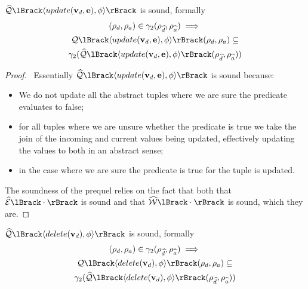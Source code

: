 \begin{conjecture}
    \label{thm:sound-update}
    $\abssqlsem{\langle update(\absattrs, \absexps), \abspred \rangle}$ is sound, formally
    \begin{multline*}
    (\rho_d, \rho_a)
        \in \concrete_2(\rho_{\ab{d}}, \rho_{\ab{a}}) \implies \\
        \sqlsem{\langle update(\absattrs, \absexps), \abspred \rangle}(\rho_d, \rho_a) \subseteq \\
        \concrete_2(\abssqlsem{\langle update(\absattrs, \absexps), \abspred \rangle}(\rho_{\ab{d}}, \rho_{\ab{a}}))
    \end{multline*}
\end{conjecture}


\begin{proof}
    \pfsketch\
    Essentially $\abssqlsem{\langle update(\absattrs, \absexps), \abspred \rangle}$ is sound because:
    \begin{itemize}
        \item We do not update all the abstract tuples where we are sure the predicate evaluates to false;
        \item for all tuples where we are unsure whether the predicate is true we take the join of the incoming and current values being updated, effectively updating the values to both in an abstract sense;
        \item in the case where we are sure the predicate is true for the tuple is updated.
    \end{itemize}
    The soundness of the prequel relies on the fact that both that $\absexpsem{\cdot}$ is sound and that $\abspredsem{\cdot}$ is sound, which they are.
\end{proof}


\begin{conjecture}
    \label{thm:sound-delete}
    $\abssqlsem{\langle delete(\absattrs), \abspred \rangle}$ is sound, formally
    \begin{multline*}
    (\rho_d, \rho_a)
        \in \concrete_2(\rho_{\ab{d}}, \rho_{\ab{a}}) \implies \\
        \sqlsem{\langle delete(\absattrs), \abspred \rangle}(\rho_d, \rho_a) \subseteq \\
        \concrete_2(\abssqlsem{\langle delete(\absattrs), \abspred \rangle}(\rho_{\ab{d}}, \rho_{\ab{a}}))
    \end{multline*}
\end{conjecture}



